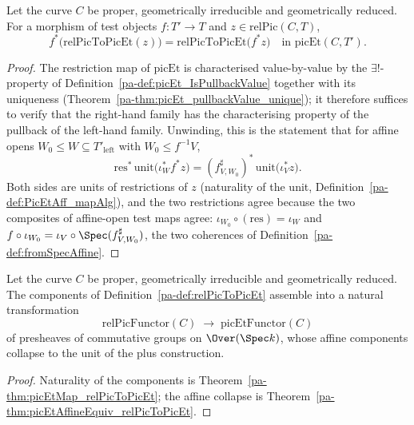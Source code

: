 \begin{theorem}
  \label{pa-thm:picEtMap_relPicToPicEt}
  \leanok

  Let the curve \(C\) be proper, geometrically irreducible and geometrically reduced. For a
  morphism of test objects \(f \colon T' \to T\) and \(z \in \mathrm{relPic}(C,T)\),
  \[
    f^{*}\bigl(\mathrm{relPicToPicEt}(z)\bigr)
      = \mathrm{relPicToPicEt}\bigl(f^{*} z\bigr)
    \quad\text{in } \mathrm{picEt}(C,T').
  \]
\end{theorem}
\begin{proof}
  \leanok
  The restriction map of \(\mathrm{picEt}\) is characterised value-by-value by the
  \(\exists!\)-property of Definition~\ref{pa-def:picEt_IsPullbackValue} together with its
  uniqueness (Theorem~\ref{pa-thm:picEt_pullbackValue_unique}); it therefore suffices to verify
  that the right-hand family has the characterising property of the pullback of the
  left-hand family. Unwinding, this is the statement that for affine opens
  \(W_0 \le W \subseteq T'_{\mathrm{left}}\) with \(W_0 \le f^{-1}V\),
  \[
    \mathrm{res}^{*}\,\mathrm{unit}\bigl(\iota_W^{*} f^{*} z\bigr)
      = (f^{\sharp}_{V,W_0})^{*}\,\mathrm{unit}\bigl(\iota_V^{*} z\bigr).
  \]
  Both sides are units of restrictions of \(z\) (naturality of the unit,
  Definition~\ref{pa-def:PicEtAff_mapAlg}), and the two restrictions agree because the two
  composites of affine-open test maps agree: \(\iota_{W_0} \circ (\text{res}) = \iota_W\) and
  \(f \circ \iota_{W_0} = \iota_V \circ \Spec(f^{\sharp}_{V,W_0})\), the two coherences of
  Definition~\ref{pa-def:fromSpecAffine}.
\end{proof}

\begin{definition}
  \label{pa-def:picEtUnit}
  \leanok

  Let the curve \(C\) be proper, geometrically irreducible and geometrically reduced. The
  components of Definition~\ref{pa-def:relPicToPicEt} assemble into a natural transformation
  \[
    \mathrm{relPicFunctor}(C) \;\longrightarrow\; \mathrm{picEtFunctor}(C)
  \]
  of presheaves of commutative groups on \(\Over(\Spec k)\), whose affine components collapse
  to the unit of the plus construction.
\end{definition}
\begin{proof}
  \leanok
  Naturality of the components is Theorem~\ref{pa-thm:picEtMap_relPicToPicEt}; the affine
  collapse is Theorem~\ref{pa-thm:picEtAffineEquiv_relPicToPicEt}.
\end{proof}

